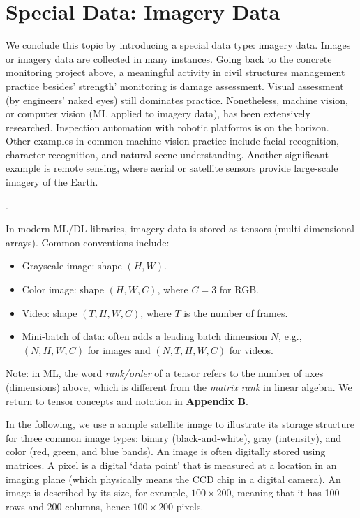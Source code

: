 \documentclass[12pt]{article}
\begin{document}
\section{Special Data: Imagery Data}

We conclude this topic by introducing a special data type: imagery data. Images or imagery data are collected in many instances. Going back to the concrete monitoring project above, a meaningful activity in civil structures management practice besides' strength' monitoring is damage assessment. Visual assessment (by engineers' naked eyes) still dominates practice. Nonetheless, machine vision, or computer vision (ML applied to imagery data), has been extensively researched. Inspection automation with robotic platforms is on the horizon. Other examples in common machine vision practice include facial recognition, character recognition, and natural-scene understanding. Another significant example is remote sensing, where aerial or satellite sensors provide large-scale imagery of the Earth. 

\begin{ex-box}
\noindent {}.

In modern ML/DL libraries, imagery data is stored as tensors (multi-dimensional arrays). Common conventions include:
\begin{itemize}
\item Grayscale image: shape $(H,W)$.
\item Color image: shape $(H,W,C)$, where $C=3$ for RGB.
\item Video: shape $(T,H,W,C)$, where $T$ is the number of frames.
\item Mini-batch of data: often adds a leading batch dimension $N$, e.g., $(N,H,W,C)$ for images and $(N,T,H,W,C)$ for videos.
\end{itemize}

Note: in ML, the word \textit{rank/order} of a tensor refers to the number of axes (dimensions) above, which is different from the \textit{matrix rank} in linear algebra. We return to tensor concepts and notation in \textbf{Appendix B}.
\end{ex-box}

In the following, we use a sample satellite image to illustrate its storage structure for three common image types: binary (black-and-white), gray (intensity), and color (red, green, and blue bands). An image is often digitally stored using matrices. A pixel is a digital `data point' that is measured at a location in an imaging plane (which physically means the CCD chip in a digital camera). An image is described by its size, for example, $100 \times 200$, meaning that it has 100 rows and 200 columns, hence $100 \times 200$ pixels. 
\end{document}
